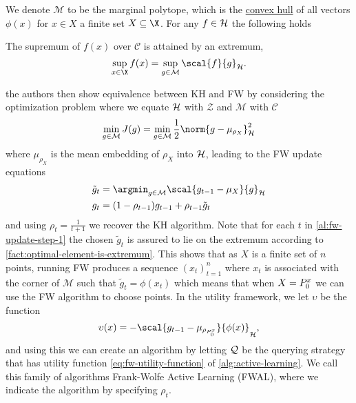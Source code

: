 We denote \(\mathcal{M}\) to be the marginal polytope, which is the
\hyperref[def:conv-hull]{convex hull} of all vectors \(\phi(x)\) for \(x \in X\)
a finite set \(X \subseteq \X\). For any \(f \in \mathcal{H}\) the following holds
\begin{fact}
\label{fact:optimal-element-is-extremum} The supremum of \(f(x)\) over
\(\mathcal{C}\) is attained by an extremum,
\begin{equation}
\label{eq:optimal-element-is-extremum} \sup_{x \in \X} f(x) = \sup_{g \in
\mathcal{M}} \scal{f}{g}_{\rkhs{H}}.
\end{equation}
\end{fact} the authors then show equivalence between KH and FW by considering
the optimization problem where we equate \(\mathcal{H}\) with \(\mathcal{Z}\) and
\(\mathcal{M}\) with \(\mathcal{C}\)
\begin{equation}
\label{eq:fw-kh-optimisation-problem} \min_{g \in \mathcal{M}} J(g) =
\min_{g \in \mathcal{M}}\frac{1}{2}\norm{g - \mu_{\rho_{X}}}_{\rkhs{H}}^{2}
\end{equation} where \(\mu_{\rho_X}\) is the mean embedding of \(\rho_X\)
into \(\mathcal{H}\), leading to the FW update equations
\begin{align} \tilde{g}_{t} & = \argmin_{g \in \mathcal{M}} \scal{g_{t-1} -
\mu_{X}}{g}_{\rkhs{H}} \label{al:fw-update-step-1}\\ g_{t} & = (1 -
\rho_{t-1}) g_{t-1} + \rho_{t-1} \tilde{g}_{t} \label{al:fw-update-step-2}
\end{align} and using \(\rho_{t} = \frac{1}{t+1}\) we recover the KH algorithm.
Note that for each \(t\) in \ref{al:fw-update-step-1} the chosen
\(\tilde{g}_{t}\) is assured to lie on the extremum according to
\ref{fact:optimal-element-is-extremum}. This shows that as \(X\) is a finite
set of \(n\) points, running FW produces a sequence \((x_{t})_{t=1}^{n}\) where
\(x_{t}\) is associated with the corner of \(\mathcal{M}\) such that
\(\tilde{g}_{t} = \phi(x_{t})\) which means that when \(X = P^x_{0}\) we
can use the FW algorithm to choose points. In the utility framework, we let
\(\upsilon\) be the function
\begin{equation}
\label{eq:fw-utility-function} \upsilon(x) = -\scal{g_{t-1} -
\mu_{\rho_{\poolsetx_{0}}}}{\phi(x)}_{\rkhs{H}},
\end{equation} and using this we can create an algorithm by letting
\(\mathcal{Q}\) be the querying strategy that has utility function
\ref{eq:fw-utility-function} of \ref{alg:active-learning}. We call this family
of algorithms Frank-Wolfe Active Learning (FWAL), where we indicate the
algorithm by specifying \(\rho_{t}\).

